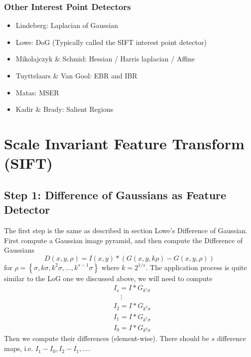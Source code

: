 \documentclass[11pt]{article}
\begin{document}
\subsubsection{Other Interest Point Detectors}
\begin{itemize}
	\item Lindeberg: Laplacian of Gaussian
	\item Lowe: DoG (Typically called the SIFT interest point detector)
	\item Mikolajczyk \& Schmid: Hessian / Harris laplacian / Affine
	\item Tuyttelaars \& Van Gool: EBR and IBR
	\item Matas: MSER
	\item Kadir \& Brady: Salient Regions
\end{itemize}


\section{Scale Invariant Feature Transform (SIFT)}
\subsection{Step 1: Difference of Gaussians as Feature Detector}
The first step is the same as described in section Lowe's Difference of Gaussian. First compute a Gaussian image pyramid, and then compute the Difference of Gaussians
\begin{equation}
	D(x, y, \rho)=I(x, y) *(G(x, y, k \rho)-G(x, y, \rho))
\end{equation}
for $\rho=\left\{\sigma, k \sigma, k^{2} \sigma, \ldots, k^{s-1} \sigma\right\}$ where $k = 2^{1/s}$. The application process is quite similar to the LoG one we discussed above, we will need to compute
\begin{align}
	&I_s = I * G_{k^s \sigma} \\
	&\quad \vdots \\
	&I_2 = I * G_{k^2\sigma} \\
	&I_1 = I * G_{k^1\sigma} \\
	&I_0 = I * G_{k^0\sigma}
\end{align}
Then we compute their differences (element-wise). There should be $s$ difference maps, i.e. $I_1 - I_0, I_2 - I_1, ...$.
\end{document}
